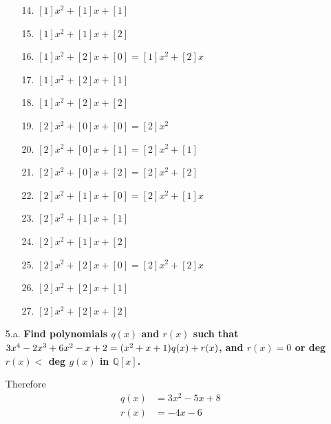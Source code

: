 \documentclass{article}
\begin{document}
\begin{enumerate}
\begin{enumerate}
				\item [14.] $[1]x^2 + [1]x + [1]$ \\
				\item [15.] $[1]x^2 + [1]x + [2]$ \\
				\item [16.] $[1]x^2 + [2]x + [0] = [1]x^2 + [2]x$ \\
				\item [17.] $[1]x^2 + [2]x + [1]$ \\
				\item [18.] $[1]x^2 + [2]x + [2]$ \\
				\item [19.] $[2]x^2 + [0]x + [0] = [2]x^2$ \\
				\item [20.] $[2]x^2 + [0]x + [1] = [2]x^2 + [1]$ \\
				\item [21.] $[2]x^2 + [0]x + [2] = [2]x^2 + [2]$ \\
				\item [22.] $[2]x^2 + [1]x + [0] = [2]x^2 + [1]x$ \\
				\item [23.] $[2]x^2 + [1]x + [1]$ \\
				\item [24.] $[2]x^2 + [1]x + [2]$ \\
				\item [25.] $[2]x^2 + [2]x + [0] = [2]x^2 + [2]x$ \\
				\item [26.] $[2]x^2 + [2]x + [1]$ \\
				\item [27.] $[2]x^2 + [2]x + [2]$ \\
			\end{enumerate}

			\newpage

		\item [5.a.] \textbf{Find polynomials $q(x)$ and $r(x)$ such that $3x^4 - 2x^3 + 6x^2 - x + 
							 2 = \\ (x^2 + x + 1)q(x) + r(x)$, and $r(x) = 0$ or deg $r(x) <$ deg 
							 $g(x)$ in $\mathbb{Q}[x]$.}


			Therefore 
			\begin{align*}
				q(x) & = 3x^2 - 5x + 8 \\
				r(x) & = -4x - 6 \\
			\end{align*}


\end{enumerate}
\end{document}
